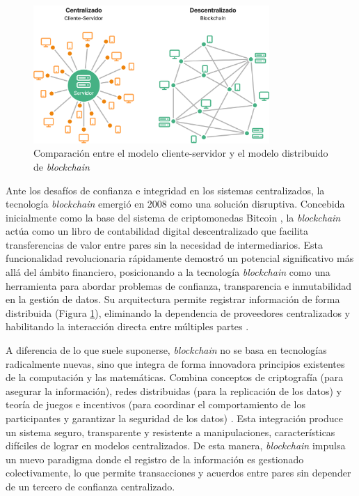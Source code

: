 \begin{figure}[!b] 
    \centering
    \includegraphics[width=0.8\textwidth]{Figures/client-server-vs-p2p.png}
    \caption{Comparación entre el modelo cliente-servidor y el modelo distribuido de \textit{blockchain}}
    \label{fig:web-architecture}
\end{figure}

Ante los desafíos de confianza e integridad en los sistemas centralizados, la tecnología \textit{blockchain} emergió en 2008 como una solución disruptiva. Concebida inicialmente como la base del sistema de \glspl{criptomoneda} Bitcoin \cite{satoshi2008bitcoin}, la \textit{blockchain} actúa como un libro de contabilidad digital descentralizado que facilita transferencias de valor entre pares sin la necesidad de intermediarios. Esta funcionalidad revolucionaria rápidamente demostró un potencial significativo más allá del ámbito financiero, posicionando a la tecnología \textit{blockchain} como una herramienta para abordar problemas de confianza, transparencia e inmutabilidad en la gestión de datos. Su arquitectura permite registrar información de forma distribuida (Figura \ref{fig:web-architecture}), eliminando la dependencia de proveedores centralizados y habilitando la interacción directa entre múltiples partes \cite{bulkowska2023implementation}.

A diferencia de lo que suele suponerse, \textit{blockchain} no se basa en tecnologías radicalmente nuevas, sino que integra de forma innovadora principios existentes de la computación y las matemáticas. Combina conceptos de criptografía (para asegurar la información), redes distribuidas (para la replicación de los datos) y teoría de juegos e incentivos (para coordinar el comportamiento de los participantes y garantizar la seguridad de los datos) \cite{sunny2022systematic, bulkowska2023implementation}. Esta integración produce un sistema seguro, transparente y resistente a manipulaciones, características difíciles de lograr en modelos centralizados. De esta manera, \textit{blockchain} impulsa un nuevo paradigma donde el registro de la información es gestionado colectivamente, lo que permite transacciones y acuerdos entre pares sin depender de un tercero de confianza centralizado.

